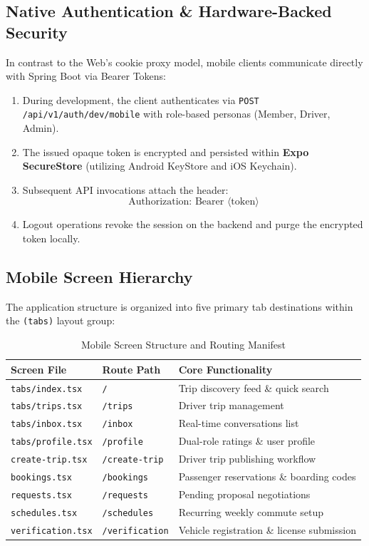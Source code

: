 \documentclass[conference,10pt,a4paper]{IEEEtran}
\begin{document}
\subsection{Native Authentication \& Hardware-Backed Security}
In contrast to the Web's cookie proxy model, mobile clients communicate directly with Spring Boot via Bearer Tokens:
\begin{enumerate}
    \item During development, the client authenticates via \texttt{POST /api/v1/auth/dev/mobile} with role-based personas (Member, Driver, Admin).
    \item The issued opaque token is encrypted and persisted within \textbf{Expo SecureStore} (utilizing Android KeyStore and iOS Keychain).
    \item Subsequent API invocations attach the header:
    \begin{equation}
    \text{Authorization: Bearer } \langle\text{token}\rangle
    \end{equation}
    \item Logout operations revoke the session on the backend and purge the encrypted token locally.
\end{enumerate}

\subsection{Mobile Screen Hierarchy}
The application structure is organized into five primary tab destinations within the \texttt{(tabs)} layout group:
\begin{table}[!ht]
\caption{Mobile Screen Structure and Routing Manifest}
\label{tab:mobile_screens}
\centering
\scriptsize
\begin{tabularx}{\columnwidth}{p{2.2cm}p{1.5cm}X}
\toprule
\textbf{Screen File} & \textbf{Route Path} & \textbf{Core Functionality} \\
\midrule
\texttt{tabs/index.tsx} & \texttt{/} & Trip discovery feed \& quick search \\
\texttt{tabs/trips.tsx} & \texttt{/trips} & Driver trip management \\
\texttt{tabs/inbox.tsx} & \texttt{/inbox} & Real-time conversations list \\
\texttt{tabs/profile.tsx} & \texttt{/profile} & Dual-role ratings \& user profile \\
\texttt{create-trip.tsx} & \texttt{/create-trip} & Driver trip publishing workflow \\
\texttt{bookings.tsx} & \texttt{/bookings} & Passenger reservations \& boarding codes \\
\texttt{requests.tsx} & \texttt{/requests} & Pending proposal negotiations \\
\texttt{schedules.tsx} & \texttt{/schedules} & Recurring weekly commute setup \\
\texttt{verification.tsx} & \texttt{/verification} & Vehicle registration \& license submission \\
\bottomrule
\end{tabularx}
\end{table}
\end{document}
